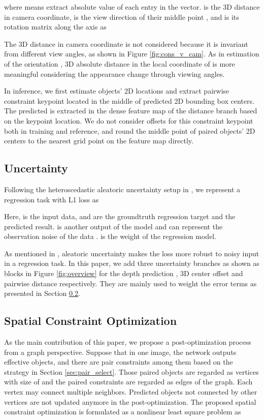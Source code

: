 \documentclass[10pt,twocolumn,letterpaper]{article}
\begin{document}
where  means extract absolute value of each entry in the vector.  is the 3D distance in camera coordinate,  is the view direction of their middle point , and  is its rotation matrix along the  axis as


The 3D distance  in camera coordinate is not considered because it is invariant from different view angles, as shown in Figure \ref{fig:cons_v_cam}. As in estimation of the orientation , 3D absolute distance  in the local coordinate of  is more meaningful considering the appearance change through viewing angles.

In inference, we first estimate objects' 2D locations and extract pairwise constraint keypoint located in the middle of predicted 2D bounding box centers. The predicted  is extracted in the dense feature map of the distance branch based on the keypoint location. We do not consider offsets for this constraint keypoint both in training and reference, and round the middle point  of paired objects' 2D centers to the nearest grid point on the feature map directly.
 
\subsection{Uncertainty}

Following the heteroscedastic aleatoric uncertainty setup in \cite{kendall2017uncertainties, kendall2019geometry}, we represent a regression task with L1 loss as

Here,  is the input data,  and  are the groundtruth regression target and the predicted result.  is another output of the model and can represent the observation noise of the data .  is the weight of the regression model.



As mentioned in \cite{kendall2017uncertainties}, aleatoric uncertainty 
makes the loss more robust to noisy input in a regression task.
In this paper, we add three uncertainty branches as shown as  blocks in Figure \ref{fig:overview} for the depth prediction ,  3D center offset  and pairwise distance  respectively. They are mainly used to weight the error terms as presented in Section \ref{sec:g_optim}.
 \subsection{Spatial Constraint Optimization}
\label{sec:g_optim}



 As the main contribution of this paper, we propose a post-optimization process from a graph perspective. Suppose that in one image, the network outputs  effective objects, and there are  pair constraints among them based on the strategy in Section \ref{sec:pair_select}.
 Those paired objects are regarded as vertices  with size of  and the  paired constraints are regarded as edges of the graph. Each vertex may connect multiple neighbors. Predicted objects not connected by other vertices are not updated anymore in the post-optimization.
 The proposed spatial constraint optimization is formulated as a nonlinear least square problem as
 
\end{document}

